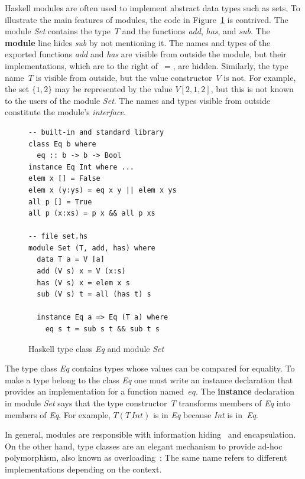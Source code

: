 \documentclass[a4paper,12pt,oneside,fleqn]{book} %
\begin{document}
Haskell modules are often used to implement abstract data types such as
sets.  To illustrate the main features of modules, the code in
Figure~\ref{fig:haskell} is contrived.  The module \textit{Set} contains
the type~$T$ and the functions \textit{add}, \textit{has}, and
\textit{sub}. The \textbf{module} line hides \textit{sub} by not mentioning
it. The names and types of the exported functions \textit{add} and
\textit{has} are visible from outside the module, but their
implementations, which are to the right of~$=$, are hidden.  Similarly, the
type name~$T$ is visible from outside, but the value constructor~$V$ is
not. For example, the set $\{1,2\}$ may be represented by the value
$V[2,1,2]$, but this is not known to the users of the module \textit{Set}.
The names and types visible from outside constitute the module's
\emph{interface}.

\begin{figure}\footnotesize %
\begin{verbatim}
-- built-in and standard library
class Eq b where
  eq :: b -> b -> Bool
instance Eq Int where ...
elem x [] = False
elem x (y:ys) = eq x y || elem x ys
all p [] = True
all p (x:xs) = p x && all p xs

-- file set.hs
module Set (T, add, has) where
  data T a = V [a]
  add (V s) x = V (x:s)
  has (V s) x = elem x s
  sub (V s) t = all (has t) s

  instance Eq a => Eq (T a) where
    eq s t = sub s t && sub t s
\end{verbatim}
\caption{Haskell type class \textit{Eq} and module \textit{Set}}
\label{fig:haskell}
\end{figure} %


The type class \textit{Eq} contains types whose values can be compared for
equality. To make a type belong to the class \textit{Eq} one must write an
instance declaration that provides an implementation for a function
named~$eq$. The \textbf{instance} declaration in module \textit{Set} says
that the type constructor~$T$ transforms members of \textit{Eq} into
members of \textit{Eq}. For example, $T(T\,\mathit{Int})$ is in \textit{Eq}
because \textit{Int} is in~\textit{Eq}.

In general, modules are responsible with information
hiding~\cite{DBLP:journals/cacm/Parnas72a} and encapsulation.  On the other
hand, type classes are an elegant mechanism to provide ad-hoc polymorphism,
also known as overloading~\cite{DBLP:conf/popl/WadlerB89}: The same name
refers to different implementations depending on the context.
\end{document}
